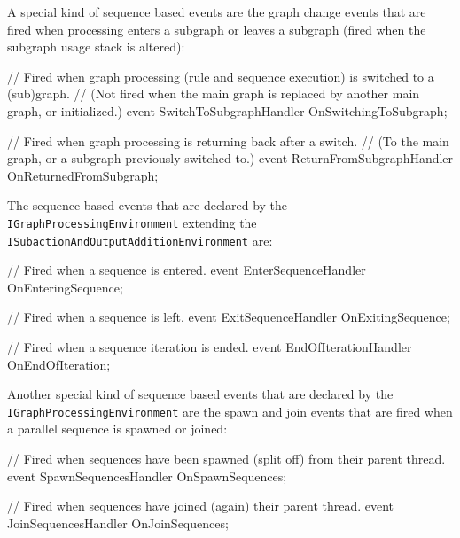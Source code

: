 A special kind of sequence based events are the graph change events that are fired when processing enters a subgraph or leaves a subgraph (fired when the subgraph usage stack is altered):

\begin{csharplet}
// Fired when graph processing (rule and sequence execution) is switched to a (sub)graph.
// (Not fired when the main graph is replaced by another main graph, or initialized.)
event SwitchToSubgraphHandler OnSwitchingToSubgraph;

// Fired when graph processing is returning back after a switch.
// (To the main graph, or a subgraph previously switched to.)
event ReturnFromSubgraphHandler OnReturnedFromSubgraph;
\end{csharplet}

The sequence based events that are declared by the \texttt{IGraph\-Processing\-Environment} extending the \texttt{ISubaction\-And\-Output\-Addition\-Environment} are:

\begin{csharplet}
// Fired when a sequence is entered.
event EnterSequenceHandler OnEnteringSequence;

// Fired when a sequence is left.
event ExitSequenceHandler OnExitingSequence;

// Fired when a sequence iteration is ended.
event EndOfIterationHandler OnEndOfIteration;
\end{csharplet}

Another special kind of sequence based events that are declared by the \texttt{IGraph\-Processing\-Environment} are the spawn and join events that are fired when a parallel sequence is spawned or joined:

\begin{csharplet}
// Fired when sequences have been spawned (split off) from their parent thread.
event SpawnSequencesHandler OnSpawnSequences;

// Fired when sequences have joined (again) their parent thread.
event JoinSequencesHandler OnJoinSequences;
\end{csharplet}
